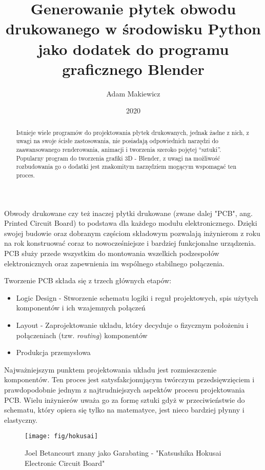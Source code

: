\documentclass[brudnopis]{xmgr}
\author   {Adam Makiewicz}
\title    {Generowanie płytek obwodu drukowanego w środowisku Python jako dodatek do programu graficznego Blender}
\date     {2020}
\begin{document}
\begin{abstract}
Istnieje wiele programów do projektowania płytek drukowanych, jednak żadne z nich, z uwagi na swoje ścisłe zastosowania, nie posiadają odpowiednich narzędzi do zaawansowanego renderowania, animacji i tworzenia szeroko pojętej “sztuki”. Popularny program do tworzenia grafiki 3D - Blender, z uwagi na możliwość rozbudowania go o dodatki jest znakomitym narzędziem mogącym wspomagać ten proces.
\end{abstract}


\maketitle

\introduction

Obwody drukowane czy też inaczej płytki drukowane (zwane dalej "PCB", ang. Printed Circuit Board) to podstawa dla każdego modułu elektronicznego. Dzięki swojej budowie oraz dobranym częściom składowym pozwalają inżynierom z roku na rok konstruować coraz to nowocześniejsze i bardziej funkcjonalne urządzenia. PCB służy przede wszystkim do montowania wszelkich podzespołów elektronicznych oraz zapewnienia im wspólnego stabilnego połączenia.

Tworzenie PCB składa się z trzech głównych etapów: \cite{Abboud}

\begin{itemize}
\item
Logic Design - Stworzenie schematu logiki i reguł projektowych, spis użytych komponentów i ich wzajemnych połączeń
\item
Layout - Zaprojektowanie układu, który decyduje o fizycznym położeniu i połączeniach (tzw.  \emph{routing}) komponentów
\item
Produkcja przemysłowa
\end{itemize}
    
    Najważniejszym punktem projektowania układu jest rozmieszczenie komponentów. Ten proces jest satysfakcjonującym twórczym przedsięwzięciem i prawdopodobnie jednym z najtrudniejszych aspektów procesu projektowania PCB. Wielu inżynierów uważa go za formę sztuki gdyż w przeciwieństwie do schematu, który opiera się tylko na matematyce, jest nieco bardziej płynny i elastyczny. 

\begin{figure}[!tbh]
\centering
\texttt{[image: fig/hokusai]}
\caption{Joel Betancourt znany jako Garabating - "Katsushika Hokusai Electronic Circuit Board"\label{RYS.1}}
\end{figure}
\end{document}
